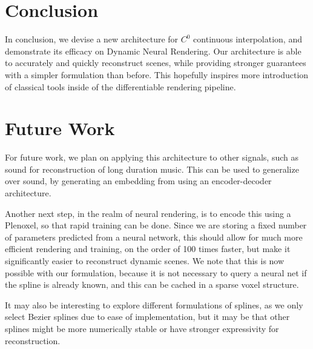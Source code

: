 \section*{Conclusion}

In conclusion, we devise a new architecture for $C^0$ continuous interpolation, and demonstrate
its efficacy on Dynamic Neural Rendering. Our architecture is able to accurately and quickly
reconstruct scenes, while providing stronger guarantees with a simpler formulation than before.
This hopefully inspires more introduction of classical tools inside of the differentiable rendering pipeline.

\section*{Future Work}

For future work, we plan on applying this architecture to other signals, such as sound for
reconstruction of long duration music. This can be used to generalize over sound, by generating
an embedding from using an encoder-decoder architecture.

Another next step, in the realm of neural rendering, is to encode this using a Plenoxel, so that
rapid training can be done. Since we are storing a fixed number of parameters predicted from a
neural network, this should allow for much more efficient rendering and training, on the order
of 100 times faster, but make it significantly easier to reconstruct dynamic scenes. We note that this is now possible with our formulation, because it is not necessary to query a neural net if the spline is already known, and this can be cached in a sparse voxel structure.

It may also be interesting to explore different formulations of splines, as we only select
Bezier splines due to ease of implementation, but it may be that other splines might be more
numerically stable or have stronger expressivity for reconstruction.
